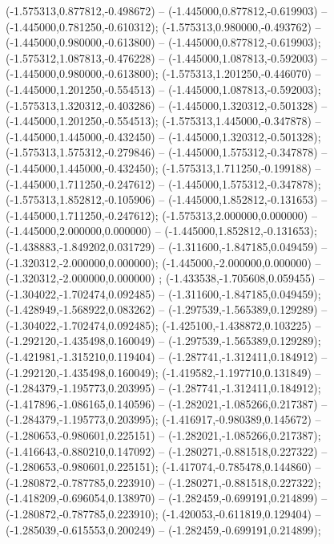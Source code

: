  (-1.575313,0.877812,-0.498672) -- (-1.445000,0.877812,-0.619903) -- (-1.445000,0.781250,-0.610312);
 (-1.575313,0.980000,-0.493762) -- (-1.445000,0.980000,-0.613800) -- (-1.445000,0.877812,-0.619903);
 (-1.575312,1.087813,-0.476228) -- (-1.445000,1.087813,-0.592003) -- (-1.445000,0.980000,-0.613800);
 (-1.575313,1.201250,-0.446070) -- (-1.445000,1.201250,-0.554513) -- (-1.445000,1.087813,-0.592003);
 (-1.575313,1.320312,-0.403286) -- (-1.445000,1.320312,-0.501328) -- (-1.445000,1.201250,-0.554513);
 (-1.575313,1.445000,-0.347878) -- (-1.445000,1.445000,-0.432450) -- (-1.445000,1.320312,-0.501328);
 (-1.575313,1.575312,-0.279846) -- (-1.445000,1.575312,-0.347878) -- (-1.445000,1.445000,-0.432450);
 (-1.575313,1.711250,-0.199188) -- (-1.445000,1.711250,-0.247612) -- (-1.445000,1.575312,-0.347878);
 (-1.575313,1.852812,-0.105906) -- (-1.445000,1.852812,-0.131653) -- (-1.445000,1.711250,-0.247612);
 (-1.575313,2.000000,0.000000) -- (-1.445000,2.000000,0.000000) -- (-1.445000,1.852812,-0.131653);
 (-1.438883,-1.849202,0.031729) -- (-1.311600,-1.847185,0.049459) -- (-1.320312,-2.000000,0.000000);
 (-1.445000,-2.000000,0.000000) -- (-1.320312,-2.000000,0.000000) ;
 (-1.433538,-1.705608,0.059455) -- (-1.304022,-1.702474,0.092485) -- (-1.311600,-1.847185,0.049459);
 (-1.428949,-1.568922,0.083262) -- (-1.297539,-1.565389,0.129289) -- (-1.304022,-1.702474,0.092485);
 (-1.425100,-1.438872,0.103225) -- (-1.292120,-1.435498,0.160049) -- (-1.297539,-1.565389,0.129289);
 (-1.421981,-1.315210,0.119404) -- (-1.287741,-1.312411,0.184912) -- (-1.292120,-1.435498,0.160049);
 (-1.419582,-1.197710,0.131849) -- (-1.284379,-1.195773,0.203995) -- (-1.287741,-1.312411,0.184912);
 (-1.417896,-1.086165,0.140596) -- (-1.282021,-1.085266,0.217387) -- (-1.284379,-1.195773,0.203995);
 (-1.416917,-0.980389,0.145672) -- (-1.280653,-0.980601,0.225151) -- (-1.282021,-1.085266,0.217387);
 (-1.416643,-0.880210,0.147092) -- (-1.280271,-0.881518,0.227322) -- (-1.280653,-0.980601,0.225151);
 (-1.417074,-0.785478,0.144860) -- (-1.280872,-0.787785,0.223910) -- (-1.280271,-0.881518,0.227322);
 (-1.418209,-0.696054,0.138970) -- (-1.282459,-0.699191,0.214899) -- (-1.280872,-0.787785,0.223910);
 (-1.420053,-0.611819,0.129404) -- (-1.285039,-0.615553,0.200249) -- (-1.282459,-0.699191,0.214899);
